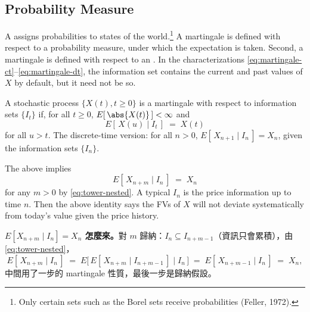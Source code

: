 \subsection{Probability Measure}
\label{sec:probability-measure}


A  assigns probabilities to states of the world.\footnote{Only certain sets such as the Borel sets receive probabilities (Feller, 1972).}
A martingale is defined with respect to a probability measure, under which the expectation is taken.
Second, a martingale is defined with respect to an .
In the characterizations \eqref{eq:martingale-ct}--\eqref{eq:martingale-dt}, the information set contains the current and past values of $X$ by default, but it need not be so.

\suppstart
{}
\suppend

\begin{definition}
	A stochastic process $\{X(t),t\ge0\}$ is a martingale with respect to information sets $\{I_{t}\}$ if, for all $t\ge0$, $E[\,\abs{X(t)}\,]<\infty$ and
	\[
		E[\,X(u)\mid I_{t}\,] \;=\; X(t)
	\]
	for all $u>t$.
	The discrete-time version: for all $n>0$, $E[\,X_{n+1}\mid I_{n}\,]=X_{n}$, given the information sets $\{I_{n}\}$.
\end{definition}

The above implies
\[
	E[\,X_{n+m}\mid I_{n}\,] \;=\; X_{n}
\]
for any $m>0$ by \eqref{eq:tower-nested}.
A typical $I_{n}$ is the price information up to time $n$.
Then the above identity says the FVs of $X$ will not deviate systematically from today's value given the price history.

\suppstart
{}

\begin{remark}
	\textbf{$E[X_{n+m}\mid I_{n}]=X_{n}$ 怎麼來。}對 $m$ 歸納：$I_{n}\subseteq I_{n+m-1}$（資訊只會累積），由 \eqref{eq:tower-nested}，
	\[
		E[\,X_{n+m}\mid I_{n}\,] \;=\; E\bigl[\,E[\,X_{n+m}\mid I_{n+m-1}\,]\mid I_{n}\,\bigr] \;=\; E[\,X_{n+m-1}\mid I_{n}\,] \;=\; X_{n} ,
	\]
	中間用了一步的 martingale 性質，最後一步是歸納假設。
\end{remark}
\suppend

